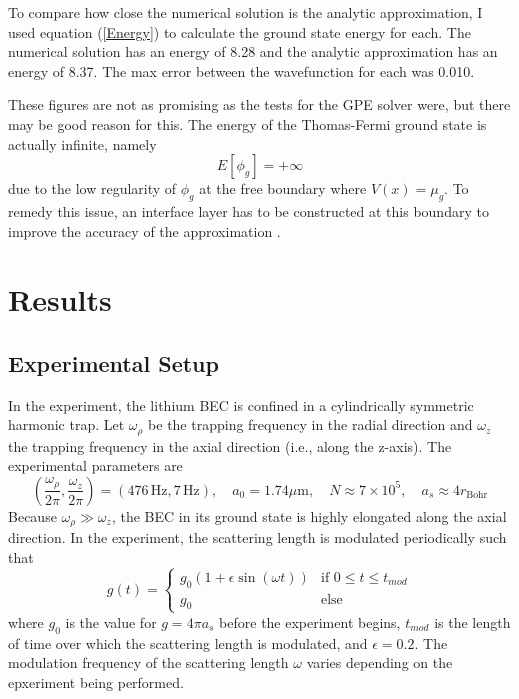 \documentclass[12]{article}
\begin{document}
To compare how close the numerical solution is the analytic approximation, I used equation (\ref{Energy}) to calculate the ground state energy for each. The numerical solution has an energy of 8.28 and the analytic approximation has an energy of 8.37. The max error between the wavefunction for each was 0.010. 

These figures are not as promising as the tests for the GPE solver were, but there may be good reason for this. The energy of the Thomas-Fermi ground state is actually infinite, namely
\begin{equation}
E[\phi_g] = +\infty
\end{equation}
due to the low regularity of $\phi_g$ at the free boundary where $V(x) = \mu_g$. To remedy this issue, an interface layer has to be constructed at this boundary to improve the accuracy of the approximation \cite{bao2003ground}.

\section{Results}

\subsection{Experimental Setup}

In the experiment, the lithium BEC is confined in a cylindrically symmetric harmonic trap. Let $\omega_\rho$ be the trapping frequency in the radial direction and $\omega_z$ the trapping frequency in the axial direction (i.e., along the z-axis). The experimental parameters are 
\begin{equation}
\left(\frac{\omega_{\rho}}{2 \pi}, \frac{\omega_{z}}{2 \pi}\right)=(476 \,\mathrm{Hz},7 \,\mathrm{Hz}) , \quad a_{0}=1.74 \mu \mathrm{m}, \quad N \approx 7 \times 10^{5}, \quad a_s \approx 4r_{\text{Bohr}}
\end{equation}
Because $\omega_\rho \gg \omega_z$, the BEC in its ground state is highly elongated along the axial direction. In the experiment, the scattering length is modulated periodically such that
\begin{equation}
  g(t) =
  \begin{cases}
		g_0(1 + \epsilon \sin(\omega t)) & \text{if $0\leq t \leq t_{mod}$} \\
		g_0 & \text{else}
  \end{cases}
\end{equation}
where $g_0$ is the value for $g = 4\pi a_s$ before the experiment begins, $t_{mod}$ is the length of time over which the scattering length is modulated, and $\epsilon = 0.2$. The modulation frequency of the scattering length $\omega$ varies depending on the epxeriment being performed. 
\end{document}
